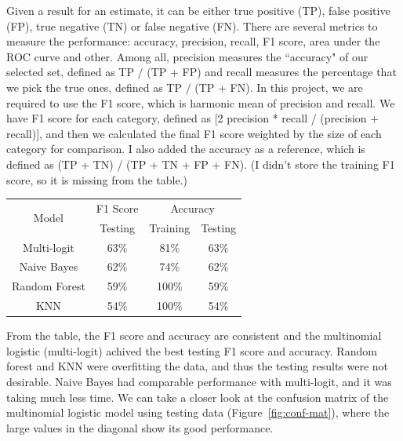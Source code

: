 \documentclass[11pt]{article}
\theoremstyle{remark}
\begin{document}
Given a result for an estimate, it can be either true positive (TP), false positive (FP), true negative (TN) or false negative (FN). 
There are several metrics to measure the performance: accuracy, precision, recall, F1 score, area under the ROC curve and other. Among all, precision measures the ``accuracy" of our selected set, defined as TP $/$ (TP + FP) and recall measures the percentage that we pick the true ones, defined as TP $/$ (TP + FN).  In this project, we are required to use the F1 score, which is harmonic mean of precision and recall. 
We have F1 score for each category, defined as [2 precision * recall / (precision + recall)], and then we calculated the final F1 score weighted by the size of each category for comparison. I also added the accuracy as a reference, which is defined as (TP + TN) / (TP + TN + FP + FN).
(I didn't store the training F1 score, so it is missing from the table.)

\begin{center}
\begin{tabular}{ |c|c|c|c| } 
 \hline
\multirow{2}{*}{Model} & \multicolumn{1}{c|}{F1 Score}  & \multicolumn{2}{c|}{Accuracy}  \\
\cline{2-4}
 & Testing & Training & Testing \\
 \hline
 Multi-logit & 63\% & 81\% & 63\% \\
 Naive Bayes & 62\% & 74\% & 62\% \\
 Random Forest & 59\% & 100\% & 59\%\\
 KNN & 54\% & 100\% & 54\%\\
 \hline
\end{tabular}
\end{center}

From the table, the F1 score and accuracy are consistent and the multinomial logistic (multi-logit) achived the best testing F1 score and accuracy. Random forest and KNN were overfitting the data, and thus the testing results were not desirable. Naive Bayes had comparable performance with multi-logit, and it was taking much less time. 
We can take a closer look at the confusion matrix of the multinomial logistic model  using testing data (Figure~\ref{fig:conf-mat}), where the large values in the diagonal show its good performance.
\end{document}
